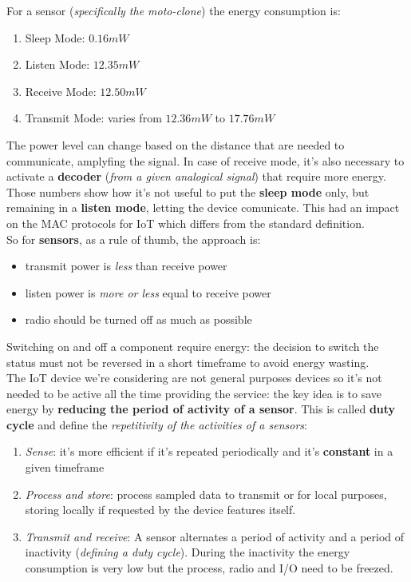 \documentclass[10pt,a4paper]{report}
\theoremstyle{definition}
\begin{document}
For a sensor (\textit{specifically the moto-clone}) the energy consumption is:
\begin{enumerate}
	\item 
	Sleep Mode:  $0.16mW$
	\item 
	Listen Mode:  $12.35 mW$
	\item 
	Receive Mode: $12.50mW$
	\item 
	Transmit Mode: varies from $12.36 mW$ to $17.76 mW$

\end{enumerate}
	The power level can change based on the distance that are needed to communicate, amplyfing the signal. In case of receive mode, it's also necessary to activate a \textbf{decoder} (\textit{from a given analogical signal}) that require more energy. Those numbers show how it's not useful to put the \textbf{sleep mode} only, but remaining in a \textbf{listen mode}, letting the device comunicate.
This had an impact on the MAC protocols for IoT which differs from the standard definition.\\
So for \textbf{sensors}, as a rule of thumb, the approach is:
\begin{itemize}
	\item 
	transmit power is \textit{less} than receive power
	\item 
	listen power is \textit{more or less} equal to receive power
	\item 
	radio should be turned off as much as possible
	
\end{itemize}
Switching on and off a component require energy: the decision to switch the status must not be reversed in a short timeframe to avoid energy wasting.\\
The IoT device we're considering are not general purposes devices so it's not needed to be active all the time providing the service: the key idea is to save energy by \textbf{reducing the period of activity of a sensor}. This is called \textbf{duty cycle} and define the \textit{repetitivity of the activities of a sensors}:
\begin{enumerate}
	\item 
	\textit{Sense}: it's more efficient if it's repeated periodically and it's \textbf{constant} in a given timeframe
	\item 
	\textit{Process and store}: process sampled data to transmit or for local purposes, storing locally if requested by the device features itself.
	\item 
	\textit{Transmit and receive}: A sensor alternates a period of activity and a period of inactivity (\textit{defining a duty cycle}). During the inactivity the energy consumption is very low but the process, radio and I/O need to be freezed.
	
\end{enumerate}
\end{document}
